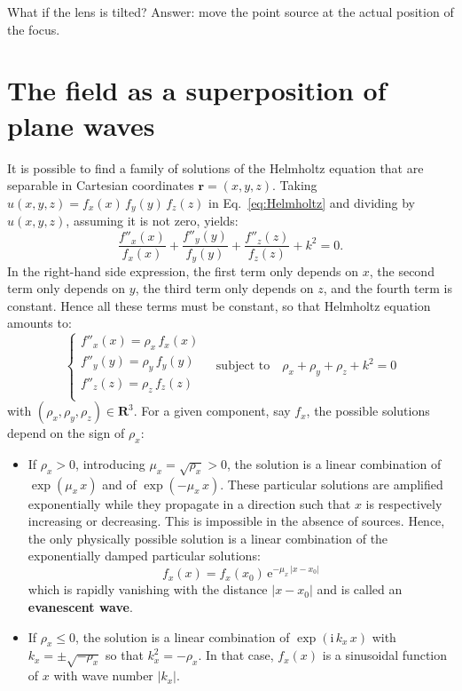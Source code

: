 \documentclass[a4paper]{article}
\newcommand{\oops}[1]{{\color{purple}#1}}
\newcommand{\V}[1]{\boldsymbol{#1}}
\newcommand*{\mathe}{\mathrm{e}}
\newcommand*{\mathi}{\mathrm{i}}
\begin{document}
\oops{What if the lens is tilted? Answer: move the point source at the actual
  position of the focus.}

\newpage
\appendix

\section{The field as a superposition of plane waves}
\label{sec:plane-waves-superposition}

It is possible to find a family of solutions of the Helmholtz equation that are
separable in Cartesian coordinates $\V{r} = (x,y,z)$. Taking
$u(x,y,z) = f_{x}(x)\,f_{y}(y)\,f_{z}(z)$ in Eq.~\eqref{eq:Helmholtz} and
dividing by $u(x,y,z)$, assuming it is not zero, yields:
\begin{displaymath}
  \frac{f''_{x}(x)}{f_{x}(x)} +
  \frac{f''_{y}(y)}{f_{y}(y)} +
  \frac{f''_{z}(z)}{f_{z}(z)} + k^{2} = 0.
\end{displaymath}
In the right-hand side expression, the first term only depends on $x$, the
second term only depends on $y$, the third term only depends on $z$, and the
fourth term is constant. Hence all these terms must be constant, so that
Helmholtz equation amounts to:
\begin{displaymath}
  \begin{cases}
    f''_{x}(x) = \rho_{x}\,f_{x}(x)\\
    f''_{y}(y) = \rho_{y}\,f_{y}(y)\\
    f''_{z}(z) = \rho_{z}\,f_{z}(z)\\
  \end{cases}
  \quad\text{subject to}\quad
  \rho_{x} + \rho_{y} + \rho_{z} + k^{2} = 0
\end{displaymath}
with $(\rho_{x},\rho_{y},\rho_{z}) ∈ \mathbb{\V{R}}^{3}$. For a given
component, say $f_{x}$, the possible solutions depend on the sign
of $\rho_{x}$:
\begin{itemize}
\item If $\rho_{x} > 0$, introducing $μ_{x} = \sqrt{\rho_{x}} > 0$, the
      solution is a linear combination of $\exp(μ_{x}\,x)$ and of
      $\exp(-μ_{x}\,x)$. These particular solutions are amplified exponentially
      while they propagate in a direction such that $x$ is respectively
      increasing or decreasing. This is impossible in the absence of sources.
      Hence, the only physically possible solution is a linear combination of
      the exponentially damped particular solutions:
      \begin{displaymath}
        f_{x}(x) = f_{x}(x_{0})\,\mathe^{-μ_{x}\,|x - x_{0}|}
      \end{displaymath}
      which is rapidly vanishing with the distance $|x - x_{0}|$ and is called
      an \textbf{evanescent wave}.

\item If $\rho_{x} ≤ 0$, the solution is a linear combination of
      $\exp(\mathi\,k_{x}\,x)$ with $k_{x} = ±\sqrt{-\rho_{x}}$ so that
      $k_{x}^{2} = -\rho_{x}$. In that case, $f_{x}(x)$ is a sinusoidal
      function of $x$ with wave number $|k_{x}|$.
\end{itemize}
\end{document}

